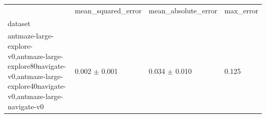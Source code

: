 \begin{tabular}{llll}
\toprule
 & mean_squared_error & mean_absolute_error & max_error \\
dataset &  &  &  \\
\midrule
antmaze-large-explore-v0,antmaze-large-explore80navigate-v0,antmaze-large-explore40navigate-v0,antmaze-large-navigate-v0 & 0.002 $\pm$ 0.001 & 0.034 $\pm$ 0.010 & 0.125 \\
\bottomrule
\end{tabular}
